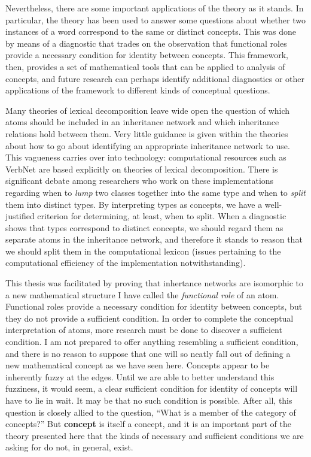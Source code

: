 Nevertheless, there are some important applications of the theory as it stands. In particular, the theory has been used to answer some questions about whether two instances of a word correspond to the same or distinct concepts. This was done by means of a diagnostic that trades on the observation that functional roles provide a necessary condition for identity between concepts. This framework, then, provides a set of mathematical tools that can be applied to analysis of concepts, and future research can perhaps identify additional diagnostics or other applications of the framework to different kinds of conceptual questions.

Many theories of lexical decomposition leave wide open the question of which atoms should be included in an inheritance network and which inheritance relations hold between them. Very little guidance is given within the theories about how to go about identifying an appropriate inheritance network to use. This vagueness carries over into technology: computational resources such as VerbNet are based explicitly on theories of lexical decomposition. There is significant debate among researchers who work on these implementations regarding when to \emph{lump} two classes together into the same type and when to \emph{split} them into distinct types. By interpreting types as concepts, we have a well-justified criterion for determining, at least, when to split. When a diagnostic shows that types correspond to distinct concepts, we should regard them as separate atoms in the inheritance network, and therefore it stands to reason that we should split them in the computational lexicon (issues pertaining to the computational efficiency of the implementation notwithstanding).

This thesis was facilitated by proving that inhertance networks are isomorphic to a new mathematical structure I have called the \emph{functional role} of an atom. Functional roles provide a necessary condition for identity between concepts, but they do not provide a sufficient condition. In order to complete the conceptual interpretation of atoms, more research must be done to discover a sufficient condition. I am not prepared to offer anything resembling a sufficient condition, and there is no reason to suppose that one will so neatly fall out of defining a new mathematical concept as we have seen here. Concepts appear to be inherently fuzzy at the edges. Until we are able to better understand this fuzziness, it would seem, a clear sufficient condition for identity of concepts will have to lie in wait. It may be that no such condition is possible. After all, this question is closely allied to the question, ``What is a member of the category of concepts?'' But {\bf concept} is itself a concept, and it is an important part of the theory presented here that the kinds of necessary and sufficient conditions we are asking for do not, in general, exist. 

\clearpage
